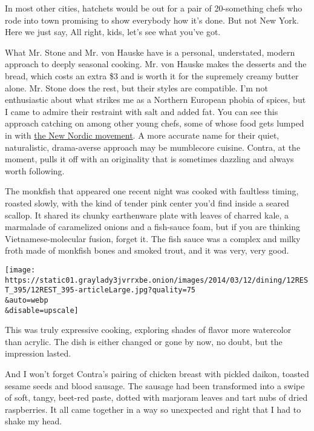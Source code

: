 In most other cities, hatchets would be out for a pair of 20-something
chefs who rode into town promising to show everybody how it's done. But
not New York. Here we just say, All right, kids, let's see what you've
got.

What Mr. Stone and Mr. von Hauske have is a personal, understated,
modern approach to deeply seasonal cooking. Mr. von Hauske makes the
desserts and the bread, which costs an extra \$3 and is worth it for the
supremely creamy butter alone. Mr. Stone does the rest, but their styles
are compatible. I'm not enthusiastic about what strikes me as a Northern
European phobia of spices, but I came to admire their restraint with
salt and added fat. You can see this approach catching on among other
young chefs, some of whose food gets lumped in with
\href{http://www.nytimes3xbfgragh.onion/2014/02/19/dining/a-nordic-quest-in-new-york.html?action=click\&module=Search\&region=searchResults\%230\&version=\&url=http\%3A\%2F\%2Fquery.nytimes3xbfgragh.onion\%2Fsearch\%2Fsitesearch\%2F\%23\%2FNew\%2BNordic\%2Bmovement\%2F}{the
New Nordic movement}. A more accurate name for their quiet,
naturalistic, drama-averse approach may be mumblecore cuisine. Contra,
at the moment, pulls it off with an originality that is sometimes
dazzling and always worth following.

The monkfish that appeared one recent night was cooked with faultless
timing, roasted slowly, with the kind of tender pink center you'd find
inside a seared scallop. It shared its chunky earthenware plate with
leaves of charred kale, a marmalade of caramelized onions and a
fish-sauce foam, but if you are thinking Vietnamese-molecular fusion,
forget it. The fish sauce was a complex and milky froth made of monkfish
bones and smoked trout, and it was very, very good.

\texttt{[image: https://static01.graylady3jvrrxbe.onion/images/2014/03/12/dining/12REST\_395/12REST\_395-articleLarge.jpg?quality=75\\\&auto=webp\\\&disable=upscale]}

This was truly expressive cooking, exploring shades of flavor more
watercolor than acrylic. The dish is either changed or gone by now, no
doubt, but the impression lasted.

And I won't forget Contra's pairing of chicken breast with pickled
daikon, toasted sesame seeds and blood sausage. The sausage had been
transformed into a swipe of soft, tangy, beet-red paste, dotted with
marjoram leaves and tart nubs of dried raspberries. It all came together
in a way so unexpected and right that I had to shake my head.

